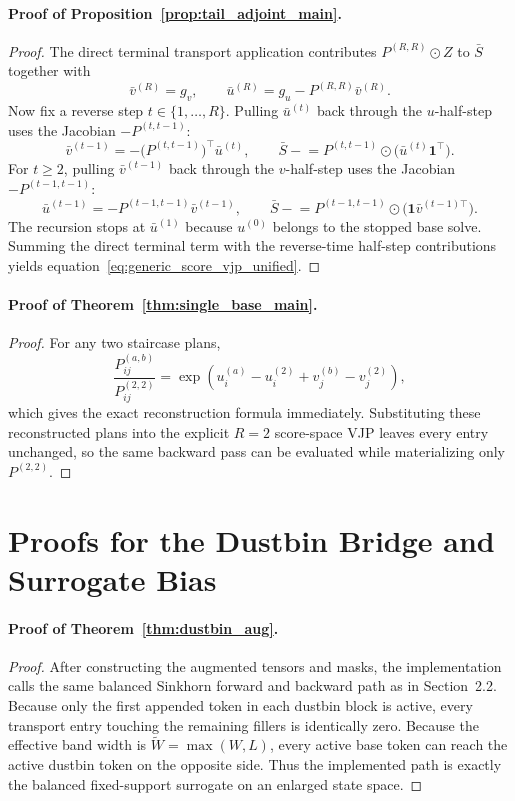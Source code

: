 \documentclass{article}
\begin{document}
\paragraph{Proof of Proposition~\ref{prop:tail_adjoint_main}.}
\begin{proof}
The direct terminal transport application contributes $P^{(R,R)}\odot Z$ to $\bar S$ together with
\[
\bar v^{(R)}=g_v,
\qquad
\bar u^{(R)}=g_u-P^{(R,R)}\bar v^{(R)}.
\]
Now fix a reverse step $t\in\{1,\dots,R\}$. Pulling $\bar u^{(t)}$ back through the $u$-half-step uses the Jacobian $-P^{(t,t-1)}$:
\[
\bar v^{(t-1)} = -\bigl(P^{(t,t-1)}\bigr)^\top \bar u^{(t)},
\qquad
\bar S \mathrel{-}= P^{(t,t-1)}\odot\bigl(\bar u^{(t)}\mathbf{1}^\top\bigr).
\]
For $t\ge 2$, pulling $\bar v^{(t-1)}$ back through the $v$-half-step uses the Jacobian $-P^{(t-1,t-1)}$:
\[
\bar u^{(t-1)} = -P^{(t-1,t-1)}\bar v^{(t-1)},
\qquad
\bar S \mathrel{-}= P^{(t-1,t-1)}\odot\bigl(\mathbf{1}\bar v^{(t-1)\top}\bigr).
\]
The recursion stops at $\bar u^{(1)}$ because $u^{(0)}$ belongs to the stopped base solve. Summing the direct terminal term with the reverse-time half-step contributions yields equation~\eqref{eq:generic_score_vjp_unified}.
\end{proof}

\paragraph{Proof of Theorem~\ref{thm:single_base_main}.}
\begin{proof}
For any two staircase plans,
\[
\frac{P_{ij}^{(a,b)}}{P_{ij}^{(2,2)}}
=
\exp(u_i^{(a)}-u_i^{(2)}+v_j^{(b)}-v_j^{(2)}),
\]
which gives the exact reconstruction formula immediately. Substituting these reconstructed plans into the explicit $R=2$ score-space VJP leaves every entry unchanged, so the same backward pass can be evaluated while materializing only $P^{(2,2)}$.
\end{proof}

\section{Proofs for the Dustbin Bridge and Surrogate Bias}
\label{app:bias}

\paragraph{Proof of Theorem~\ref{thm:dustbin_aug}.}
\begin{proof}
After constructing the augmented tensors and masks, the implementation calls the same balanced Sinkhorn forward and backward path as in Section~2.2. Because only the first appended token in each dustbin block is active, every transport entry touching the remaining fillers is identically zero. Because the effective band width is $\widetilde W=\max(W,L)$, every active base token can reach the active dustbin token on the opposite side. Thus the implemented path is exactly the balanced fixed-support surrogate on an enlarged state space.
\end{proof}
\end{document}
